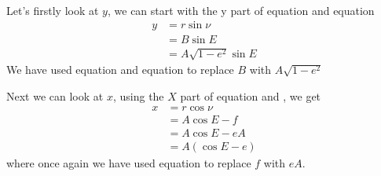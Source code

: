 Let's firstly look at $y$, we can start with the y part of equation  and equation 
\begin{align}
y &= r \sin \nu \nonumber \\
&= B \sin E \nonumber \\
&= A\sqrt{1-e^2} \sin E
\end{align}
We have used equation  and equation  to replace $B$ with $A\sqrt{1-e^2}$ 

Next we can look at $x$, using the $X$ part of equation  and , we get
\begin{align}
x &= r \cos \nu \nonumber \\
&= A \cos E -f  \nonumber \\
&= A \cos E - eA  \nonumber \\
&= A(\cos E -e)
\end{align}
where once again we have used equation  to replace $f$ with $eA$.

